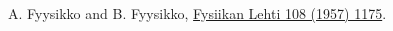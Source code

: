\documentclass[12pt]{article}
\begin{document}

\begin{thebibliography}{9}

A. Fyysikko and B. Fyysikko,
\href{http://link.aps.org/abstract/PR/v108/p1175}{Fysiikan Lehti 108
(1957) 1175}.
\end{thebibliography}
\end{document}
